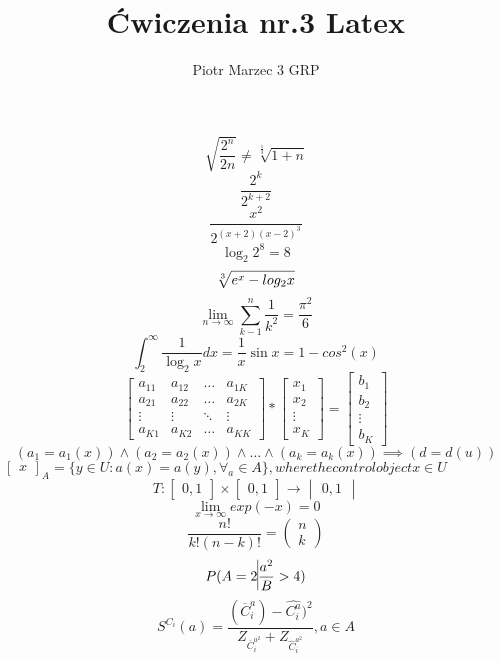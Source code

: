 \documentclass[a4paper]{article}
\author{Piotr Marzec 3 GRP}
\title{Ćwiczenia nr.3 Latex}
\begin{document}
$$\sqrt{\frac{2^n}{2n}} \neq \sqrt[\frac{1}{3}]{1+n}$$
$$\frac{2^k}{2^{k+2}}$$
$$\frac{x^2}{2^{(x+2)(x-2)^3}}$$
$$\log_2 2^8=8$$
$$\sqrt[3]{e^x-\\log_2 x}$$
$$\lim_{n\to \infty}\sum_{k-1}^{n} \frac{1}{k^2}=\frac{\pi^2}{6}$$
$$\int_{2}^{\infty}\frac{1}{\log_2x}dx=\frac{1}{x} \sin x=1-cos^2(x)$$
$$
\begin{bmatrix}
a_{11}&a_{12}&\ldots&a_{1K}\\
a_{21}&a_{22}&\ldots&a_{2K}\\
\vdots&\vdots&\ddots&\vdots\\
a_{K1}&a_{K2}&\ldots&a_{KK}
\end{bmatrix} *
\begin{bmatrix}
x_1\\
x_2\\
\vdots \\
x_{K}
\end{bmatrix} =
\begin{bmatrix}
b_1\\
b_2\\
\vdots\\
b_K
\end{bmatrix}
$$
$$	(a_1=a_1(x)) \land (a_2=a_2(x)) \land \ldots \land (a_k=a_k(x)) \implies (d=d(u)) $$
$\begin{bmatrix}x\end{bmatrix}_A=\{y \in U :a(x)=a(y),\forall_a \in A\}, where the control object x \in U$
$$T : \begin{bmatrix}0, 1\end{bmatrix} \times \begin{bmatrix}0, 1\end{bmatrix}\to \begin{vmatrix}0, 1\end{vmatrix} $$
$$\lim_{x\to\infty} exp(-x)=0$$
$$\frac{n!}{k!(n-k)!} = \begin{pmatrix}n\\k \end{pmatrix}$$
$$P(A=2\vrule\frac{a^2}{B}>4)$$
$$S^{C_i}(a)=\frac{(\overline{C}^{a}_i)-\hat{C^{a}_i})^2} {Z_{\overline{C}^{a^2}_i} + Z_{\hat{C}^{a^2}_i}},a \in  A$$
\end{document}
